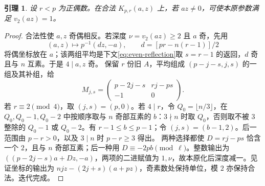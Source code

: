 \documentclass[11pt,a4paper]{article}
\newtheorem{lemma}[theorem]{引理}
\theoremstyle{definition}
\numberwithin{equation}{section}
\begin{document}
\begin{lemma}\label{lem:binary-depth}
设 $r<p$ 为正偶数。在合法 $K_{p,r}(a,z)$ 上，若 $az\ne0$，可使本原参数满足 $v_2(az)=1$。
\end{lemma}
\begin{proof}
合法性使 $a,z$ 奇偶相反。若深度 $\nu=v_2(az)\ge2$ 且 $a$ 奇，先用
\[
(a,z)\mapsto p^{-1}(dz,-a),\qquad d=[pr-n(r-1)]/2
\]
将偶坐标放在 $a$；该两组平均是下文\eqref{eq:even-reflection}取 $s=r-1$ 的返回，$d$ 奇且与 $n$ 互素。于是 $4\mid a,z$ 奇。
保留 $r$ 份旧 $A$，平均组成 $(p-j-s,j,s)$ 的一组及其补组，给
\[
M_{j,s}=\begin{pmatrix}p-2j-s&rj-ps\\-1&0\end{pmatrix}.
\]
若 $r\equiv2\pmod4$，取 $(j,s)=(p,0)$。若 $4\mid r$，令 $Q_0=\lfloor n/3\rfloor$，在 $Q_0,Q_0-1,Q_0-2$ 中按顺序取与 $n$ 奇部互素的 $b$：$3\nmid n$ 时取 $Q_0$，否则取不被 $3$ 整除的 $Q_0-1$ 或 $Q_0-2$。有 $r-1\le b\le p-1$；令 $(j,s)=(b-1,2)$。后一范围由 $p-r>0$，以及 $3\mid n$ 时 $p-r\ge3$ 得出。
两种选择都使 $D=rj-ps$ 恰含一个 $2$，且与 $n$ 奇部互素；后一种用 $D\equiv-2pb\pmod\ell$。整数输出为 $((p-2j-s)a+Dz,-a)$，两项的二进赋值为 $1,\nu$，故本原化后深度减一。见证坐标的输出为 $njz-(2j+s)(a+pz)$，奇素数处保持单位，模 $2$ 亦保持合法。迭代完成。
\end{proof}
\end{document}
